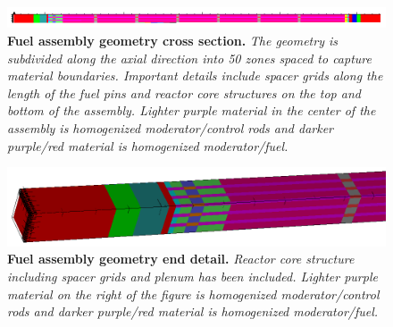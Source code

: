 \begin{figure}[t!]
  \begin{center}
    \includegraphics[width=6.0in]{chapters/spn_equations/problem3_axial_mat.png}
  \end{center}
  \caption{\textbf{Fuel assembly geometry cross section.} \textit{The
      geometry is subdivided along the axial direction into 50 zones
      spaced to capture material boundaries. Important details include
      spacer grids along the length of the fuel pins and reactor core
      structures on the top and bottom of the assembly. Lighter purple
      material in the center of the assembly is homogenized
      moderator/control rods and darker purple/red material is
      homogenized moderator/fuel.}}
  \label{fig:problem3_axial_mat}
\end{figure}
\begin{figure}[t!]
  \begin{center}
    \includegraphics[width=6.0in]{chapters/spn_equations/problem3_end.png}
  \end{center}
  \caption{\textbf{Fuel assembly geometry end detail.}
    \textit{Reactor core structure including spacer grids and plenum
      has been included. Lighter purple material on the right of the
      figure is homogenized moderator/control rods and darker
      purple/red material is homogenized moderator/fuel.}}
  \label{fig:problem3_end}
\end{figure}

